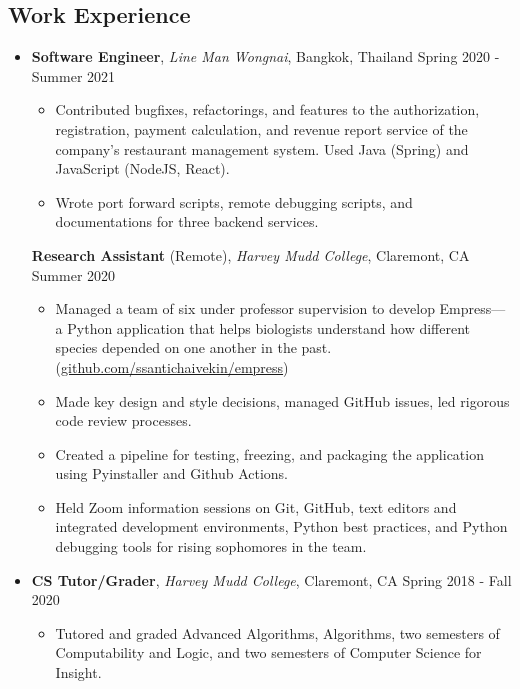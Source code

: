 \documentclass[10pt,letterpaper]{article}
\begin{document}
\subsection*{Work Experience}
  \begin{itemize}
    \parskip=-0.05em
    \item[]
    {\textbf{Software Engineer}, \textit{Line Man Wongnai}, Bangkok, Thailand \hfill {Spring 2020 - Summer 2021}}
    \begin{itemize}[label=\textbullet]
      \itemsep0.1em
      \item Contributed bugfixes, refactorings, and features to the authorization, registration, payment calculation, and revenue report service of the company's restaurant management system. Used Java (Spring) and JavaScript (NodeJS, React).
      \item Wrote port forward scripts, remote debugging scripts, and documentations for three backend services.
    \end{itemize}
    {\textbf{Research Assistant} (Remote), \textit{Harvey Mudd College}, Claremont, CA \hfill {Summer 2020}}
    \begin{itemize}[label=\textbullet]
      \itemsep0.1em
      \item Managed a team of six under professor supervision to develop Empress---a Python application that helps biologists understand how different species depended on one another in the past. (\href{https://github.com/ssantichaivekin/empress}{github.com/ssantichaivekin/empress})
      \item Made key design and style decisions, managed GitHub issues, led rigorous code review processes.
      \item Created a pipeline for testing, freezing, and packaging the application using Pyinstaller and Github Actions.
      \item Held Zoom information sessions on Git, GitHub, text editors and integrated development environments, Python best practices, and Python debugging tools for rising sophomores in the team.
    \end{itemize}
    \item[]
    {\textbf{CS Tutor/Grader}, \textit{Harvey Mudd College}, Claremont, CA \hfill {Spring 2018 - Fall 2020}}
    \begin{itemize}[label=\textbullet]
      \itemsep0.1em
      \item Tutored and graded Advanced Algorithms, Algorithms, two semesters of Computability and Logic, and two semesters of Computer Science for Insight.

\end{itemize}
\end{itemize}
\end{document}
